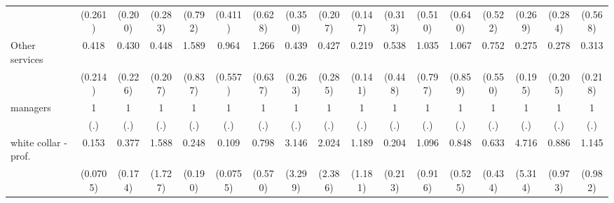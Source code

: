 {\begin{tabular}{l*{16}{c}}
                    &     (0.261)         &     (0.200)         &     (0.283)         &     (0.792)         &     (0.411)         &     (0.628)         &     (0.350)         &     (0.207)         &     (0.147)         &     (0.313)         &     (0.510)         &     (0.640)         &     (0.522)         &     (0.269)         &     (0.284)         &     (0.568)         \\
[1em]
Other services      &       0.418         &       0.430         &       0.448         &       1.589         &       0.964         &       1.266         &       0.439         &       0.427         &       0.219\sym{*}  &       0.538         &       1.035         &       1.067         &       0.752         &       0.275         &       0.278         &       0.313         \\
                    &     (0.214)         &     (0.226)         &     (0.207)         &     (0.837)         &     (0.557)         &     (0.637)         &     (0.263)         &     (0.285)         &     (0.141)         &     (0.448)         &     (0.797)         &     (0.859)         &     (0.550)         &     (0.195)         &     (0.205)         &     (0.218)         \\
[1em]
managers            &           1         &           1         &           1         &           1         &           1         &           1         &           1         &           1         &           1         &           1         &           1         &           1         &           1         &           1         &           1         &           1         \\
                    &         (.)         &         (.)         &         (.)         &         (.)         &         (.)         &         (.)         &         (.)         &         (.)         &         (.)         &         (.)         &         (.)         &         (.)         &         (.)         &         (.)         &         (.)         &         (.)         \\
[1em]
white collar - prof.&       0.153\sym{***}&       0.377\sym{*}  &       1.588         &       0.248         &       0.109\sym{**} &       0.798         &       3.146         &       2.024         &       1.189         &       0.204         &       1.096         &       0.848         &       0.633         &       4.716         &       0.886         &       1.145         \\
                    &    (0.0705)         &     (0.174)         &     (1.727)         &     (0.190)         &    (0.0755)         &     (0.570)         &     (3.299)         &     (2.386)         &     (1.181)         &     (0.213)         &     (0.916)         &     (0.525)         &     (0.434)         &     (5.314)         &     (0.973)         &     (0.982)         \\

\end{tabular}}
